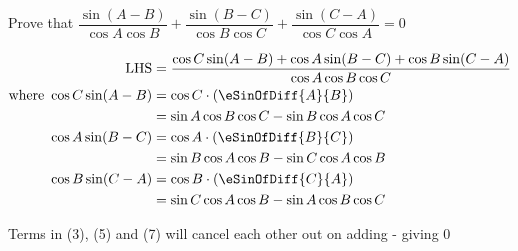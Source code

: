 
%
%
%
%
% 
% 

\question[2] Prove that $\dfrac{\sin(A-B)}{\cos A\cos B} + \dfrac{\sin(B-C)}{\cos B\cos C} 
+ \dfrac{\sin(C-A)}{\cos C\cos A} = 0$


\ifprintanswers
\fi 

\begin{solution}[\halfpage]
  \begin{fullwidth}
    \begin{align}
      \text{LHS} &= \dfrac{\cos C\sin(A-B) + \cos A\sin(B-C) + 
        \cos B\sin(C-A)}{\cos A\cos B\cos C} \\
      \text{where }\cos C\sin(A-B) &= \cos C\cdot(\eSinOfDiff{A}{B}) \\
           &= \sin A\cos B\cos C - \sin B\cos A\cos C \\
       \cos A\sin(B-C) &= \cos A\cdot(\eSinOfDiff{B}{C}) \\
          &= \sin B\cos A\cos B - \sin C\cos A\cos B \\
       \cos B\sin(C-A) &= \cos B\cdot(\eSinOfDiff{C}{A}) \\
          &= \sin C\cos A\cos B - \sin A\cos B\cos C
    \end{align}

    Terms in (3), (5) and (7) will cancel each other out on adding - giving $0$ 
  \end{fullwidth}
\end{solution}

